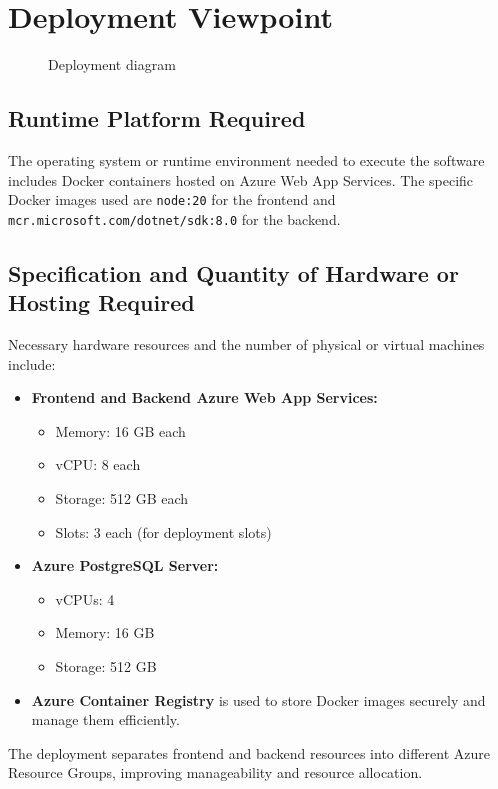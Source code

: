 \section{Deployment Viewpoint}

\begin{figure}[ht]
    \centering
    
    \caption{Deployment diagram}
    \label{deployment-diagram}
\end{figure}

\subsection{Runtime Platform Required}
The operating system or runtime environment needed to execute the software includes Docker containers hosted on Azure Web App Services. The specific Docker images used are \texttt{node:20} for the frontend and \texttt{mcr.microsoft.com/dotnet/sdk:8.0} for the backend.

\subsection{Specification and Quantity of Hardware or Hosting Required}
Necessary hardware resources and the number of physical or virtual machines include:
\begin{itemize}
    \item \textbf{Frontend and Backend Azure Web App Services:}
    \begin{itemize}
        \item Memory: 16 GB each
        \item vCPU: 8 each
        \item Storage: 512 GB each
        \item Slots: 3 each (for deployment slots)
    \end{itemize}
    \item \textbf{Azure PostgreSQL Server:}
    \begin{itemize}
        \item vCPUs: 4
        \item Memory: 16 GB
        \item Storage: 512 GB
    \end{itemize}
    \item \textbf{Azure Container Registry} is used to store Docker images securely and manage them efficiently.
\end{itemize}
The deployment separates frontend and backend resources into different Azure Resource Groups, improving manageability and resource allocation.


